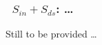 \vsssub
\subsubsection{~$S_{in} + S_{ds}$: \ldots} \label{sec:ST5}
\vsssub


\noindent
Still to be provided \ldots
